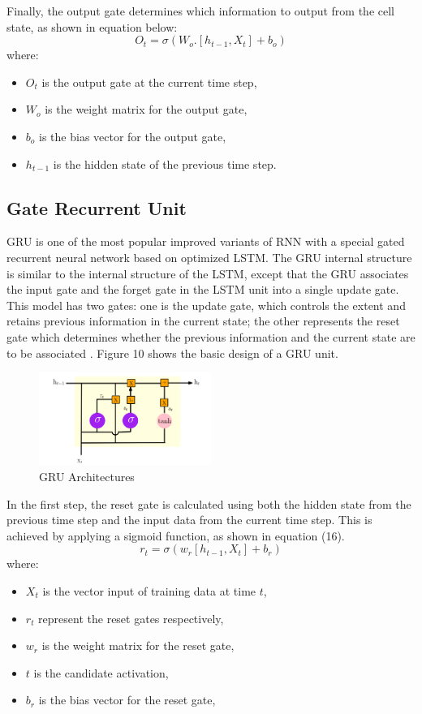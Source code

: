 \documentclass{ieeeojies}
\begin{document}
Finally, the output gate determines which information to output from the cell state, as shown in equation below:
\begin{equation}
    O_t = \sigma(W_o.[h_{t-1}, X_t] + b_o)
\end{equation}
where:
\begin{itemize}
    \item $O_t$ is the output gate at the current time step,
    \item $W_o$ is the weight matrix for the output gate,
    \item $b_o$ is the bias vector for the output gate,
    \item $h_{t-1}$ is the hidden state of the previous time step.
\end{itemize}

\subsection{Gate Recurrent Unit}
GRU is one of the most popular improved variants of RNN with a special gated recurrent neural network based on optimized LSTM. The GRU internal structure is similar to the internal structure of the LSTM, except that the GRU associates the input gate and the forget gate in the LSTM unit into a single update gate. This model has two gates: one is the update gate, which controls the extent and retains previous information in the current state; the other represents the reset gate which determines whether the previous information and the current state are to be associated \cite{b14}. Figure 10 shows the basic design of a GRU unit.
\begin{figure} [H]
    \centering
    \includegraphics[width=0.5\textwidth]{bibliography/Figure/GRU.png}
    \caption{GRU Architectures}
    \label{fig:GRU structure}
\end{figure}
In the first step, the reset gate is calculated using both the hidden state from the previous time step and the input data from the current time step. This is achieved by applying a sigmoid function, as shown in equation (16).
\begin{equation}
    r_t = \sigma(w_r[h_{t - 1}, X_t] + b_r)
\end{equation}
where:
\begin{itemize}
    \item $X_t$ is the vector input of training data at time $t$,
    \item $r_t$ represent the reset gates respectively,
    \item $w_r$ is the weight matrix for the reset gate,
    \item $t$ is the candidate activation,
    \item $b_r$ is the bias vector for the reset gate,
\end{itemize}
\end{document}
